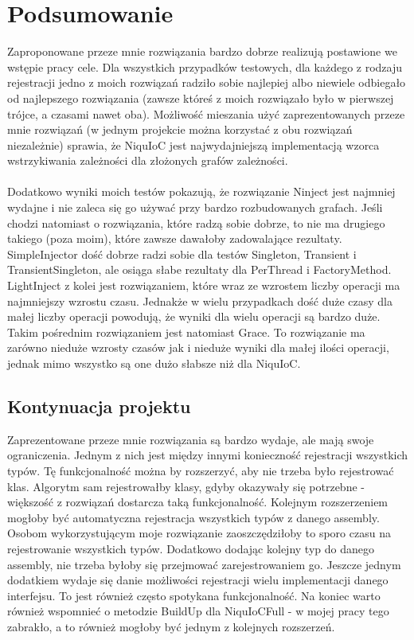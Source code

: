 \documentclass[12pt]{article}
\begin{document}
\section{Podsumowanie}
Zaproponowane przeze mnie rozwiązania bardzo dobrze realizują postawione we wstępie pracy cele. Dla wszystkich przypadków testowych, dla każdego z rodzaju rejestracji jedno z moich rozwiązań radziło sobie najlepiej albo niewiele odbiegało od najlepszego rozwiązania (zawsze któreś z moich rozwiązało było w pierwszej trójce, a czasami nawet oba). Możliwość mieszania użyć zaprezentowanych przeze mnie rozwiązań (w jednym projekcie można korzystać z obu rozwiązań niezależnie) sprawia, że NiquIoC jest najwydajniejszą implementacją wzorca wstrzykiwania zależności dla złożonych grafów zależności.\\ 
\\
Dodatkowo wyniki moich testów pokazują, że rozwiązanie Ninject jest najmniej wydajne i nie zaleca się go używać przy bardzo rozbudowanych grafach. Jeśli chodzi natomiast o rozwiązania, które radzą sobie dobrze, to nie ma drugiego takiego (poza moim), które zawsze dawałoby zadowalające rezultaty. SimpleInjector dość dobrze radzi sobie dla testów Singleton, Transient i TransientSingleton, ale osiąga słabe rezultaty dla PerThread i FactoryMethod. LightInject z kolei jest rozwiązaniem, które wraz ze wzrostem liczby operacji ma najmniejszy wzrostu czasu. Jednakże w wielu przypadkach dość duże czasy dla małej liczby operacji powodują, że wyniki dla wielu operacji są bardzo duże. Takim pośrednim rozwiązaniem jest natomiast Grace. To rozwiązanie ma zarówno nieduże wzrosty czasów jak i nieduże wyniki dla małej ilości operacji, jednak mimo wszystko są one dużo słabsze niż dla NiquIoC.

\subsection{Kontynuacja projektu}
Zaprezentowane przeze mnie rozwiązania są bardzo wydaje, ale mają swoje ograniczenia. Jednym z nich jest między innymi konieczność rejestracji wszystkich typów. Tę funkcjonalność można by rozszerzyć, aby nie trzeba było rejestrować klas. Algorytm sam rejestrowałby klasy, gdyby okazywały się potrzebne - większość z rozwiązań dostarcza taką funkcjonalność. Kolejnym rozszerzeniem mogłoby być automatyczna rejestracja wszystkich typów z danego assembly. Osobom wykorzystującym moje rozwiązanie zaoszczędziłoby to sporo czasu na rejestrowanie wszystkich typów. Dodatkowo dodając kolejny typ do danego assembly, nie trzeba byłoby się przejmować zarejestrowaniem go. Jeszcze jednym dodatkiem wydaje się danie możliwości rejestracji wielu implementacji danego interfejsu. To jest również często spotykana funkcjonalność. Na koniec warto również wspomnieć o metodzie BuildUp dla NiquIoCFull - w mojej pracy tego zabrakło, a to również mogłoby być jednym z kolejnych rozszerzeń.
\end{document}
